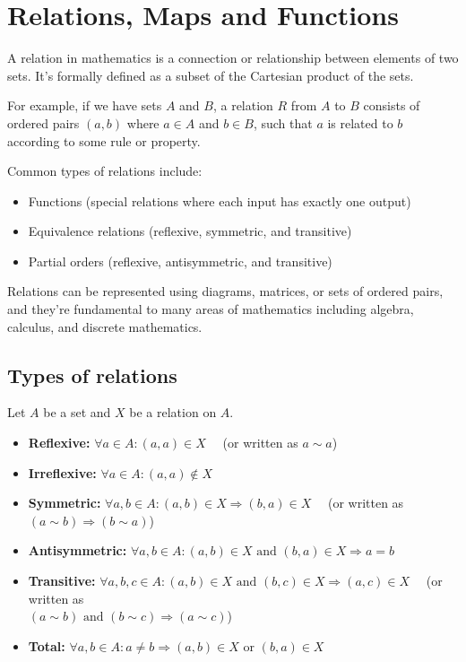 \section{Relations, Maps and Functions}
A relation in mathematics is a connection or relationship between elements of two sets. It's formally
defined as a subset of the Cartesian product of the sets.

For example, if we have sets $A$ and $B$, a relation $R$ from $A$ to $B$ consists
of ordered pairs $(a,b)$ where $a \in A$ and $b \in B$, such that $a$ is related to $b$ according to some rule or property.

Common types of relations include:
\begin{itemize}
	\item Functions (special relations where each input has exactly one output)
	\item Equivalence relations (reflexive, symmetric, and transitive)
	\item Partial orders (reflexive, antisymmetric, and transitive)
\end{itemize}

Relations can be represented using diagrams, matrices, or sets of
ordered pairs, and they're fundamental to many areas of mathematics including algebra, calculus, and discrete mathematics.

\subsection{Types of relations}

Let $A$ be a set and $X$ be a relation on $A$.

\begin{itemize}
	\item \textbf{Reflexive:} $\forall a \in A: (a, a) \in X$ \ \ (or written as $a \sim a$)

	\item \textbf{Irreflexive:} $\forall a \in A: (a, a) \not\in X$

	\item \textbf{Symmetric:} $\forall a, b \in A: (a, b) \in X \Rightarrow (b, a) \in X$ \ \ (or written as $(a \sim b) \Rightarrow (b \sim a)$)

	\item \textbf{Antisymmetric:} $\forall a, b \in A: (a, b) \in X \text{ and } (b, a) \in X \Rightarrow a = b$

	\item \textbf{Transitive:} $\forall a, b, c \in A: (a, b) \in X \text{ and } (b, c) \in X \Rightarrow (a, c) \in X$ \ \ (or written as \\$(a \sim b) \text{ and } (b \sim c) \Rightarrow (a \sim c)$)

	\item \textbf{Total:} $\forall a,b \in A: a \neq b \Rightarrow (a, b) \in X \text{ or } (b, a) \in X$
\end{itemize}

